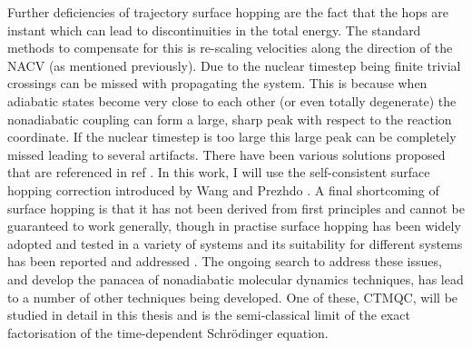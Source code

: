 Further deficiencies of trajectory surface hopping are the fact that the hops are instant which can lead to discontinuities in the total energy. The standard methods to compensate for this is re-scaling velocities along the direction of the NACV (as mentioned previously). Due to the nuclear timestep being finite trivial crossings can be missed with propagating the system. This is because when adiabatic states become very close to each other (or even totally degenerate) the nonadiabatic coupling can form a large, sharp peak with respect to the reaction coordinate. If the nuclear timestep is too large this large peak can be completely missed leading to several artifacts. There have been various solutions proposed that are referenced in ref \cite{Carof2017FSSH, Wang2016}. In this work, I will use the self-consistent surface hopping correction introduced by Wang and Prezhdo \cite{Wang2014}.  A final shortcoming of surface hopping is that it has not been derived from first principles and cannot be guaranteed to work generally, though in practise surface hopping has been widely adopted and tested in a variety of systems and its suitability for different systems has been reported and addressed \cite{Wang2016}. The ongoing search to address these issues, and develop the panacea of nonadiabatic molecular dynamics techniques,  has lead to a number of other techniques being developed. One of these, CTMQC, will be studied in detail in this thesis and is the semi-classical limit of the exact factorisation of the time-dependent Schr\"odinger equation.
